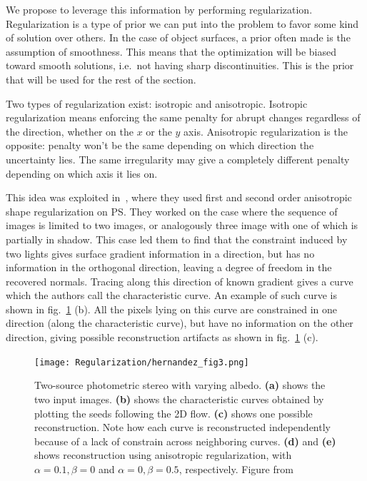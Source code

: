 We propose to leverage this information by performing regularization. Regularization is a type of prior we can put into the problem to favor some kind of solution over others. In the case of object surfaces, a prior often made is the assumption of smoothness. This means that the optimization will be biased toward smooth solutions, i.e.\ not having sharp discontinuities. This is the prior that will be used for the rest of the section.

Two types of regularization exist: isotropic and anisotropic. Isotropic regularization means enforcing the same penalty for abrupt changes regardless of the direction, whether on the $x$ or the $y$ axis. Anisotropic regularization is the opposite: penalty won't be the same depending on which direction the uncertainty lies. The same irregularity may give a completely different penalty depending on which axis it lies on.

This idea was exploited in~\cite{hernandez-pami-11}, where they used first and second order anisotropic shape regularization on PS. They worked on the case where the sequence of images is limited to two images, or analogously three image with one of which is partially in shadow. This case led them to find that the constraint induced by two lights gives surface gradient information in a direction, but has no information in the orthogonal direction, leaving a degree of freedom in the recovered normals. Tracing along this direction of known gradient gives a curve which the authors call the characteristic curve. An example of such curve is shown in fig.~\ref{fig:reg-her3} (b). All the pixels lying on this curve are constrained in one direction (along the characteristic curve), but have no information on the other direction, giving possible reconstruction artifacts as shown in fig.~\ref{fig:reg-her3} (c).

\begin{figure}
\centering
\texttt{[image: Regularization/hernandez\_fig3.png]}
\caption{Two-source photometric stereo with varying albedo. \textbf{(a)} shows the two input images. \textbf{(b)} shows the characteristic curves obtained by plotting the seeds following the 2D flow. \textbf{(c)} shows one possible reconstruction. Note how each curve is reconstructed independently because of a lack of constrain across neighboring curves. \textbf{(d)} and \textbf{(e)} shows reconstruction using anisotropic regularization, with $\alpha = 0.1, \beta = 0$ and $\alpha = 0, \beta = 0.5$, respectively. Figure from~\cite{hernandez-pami-11}}
\label{fig:reg-her3}
\end{figure}

